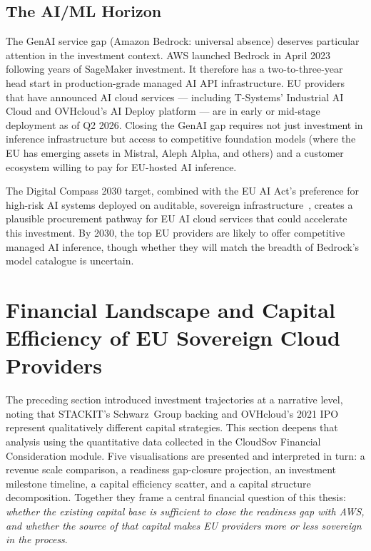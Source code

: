 \subsection{The AI/ML Horizon}

The GenAI service gap (Amazon Bedrock: universal absence) deserves particular attention in the investment context. AWS launched Bedrock in April 2023 following years of SageMaker investment. It therefore has a two-to-three-year head start in production-grade managed AI API infrastructure. EU providers that have announced AI cloud services — including T-Systems' Industrial AI Cloud and OVHcloud's AI Deploy platform — are in early or mid-stage deployment as of Q2 2026. Closing the GenAI gap requires not just investment in inference infrastructure but access to competitive foundation models (where the EU has emerging assets in Mistral, Aleph Alpha, and others) and a customer ecosystem willing to pay for EU-hosted AI inference.

The Digital Compass 2030 target, combined with the EU AI Act's preference for high-risk AI systems deployed on auditable, sovereign infrastructure~\cite{NIS2_2022}, creates a plausible procurement pathway for EU AI cloud services that could accelerate this investment. By 2030, the top EU providers are likely to offer competitive managed AI inference, though whether they will match the breadth of Bedrock's model catalogue is uncertain.

\section{Financial Landscape and Capital Efficiency of EU Sovereign Cloud Providers}
\label{sec:financial_landscape}

The preceding section introduced investment trajectories at a narrative level, noting that STACKIT's Schwarz~Group backing and OVHcloud's 2021 IPO represent qualitatively different capital strategies. This section deepens that analysis using the quantitative data collected in the CloudSov Financial Consideration module. Five visualisations are presented and interpreted in turn: a revenue scale comparison, a readiness gap-closure projection, an investment milestone timeline, a capital efficiency scatter, and a capital structure decomposition. Together they frame a central financial question of this thesis: \emph{whether the existing capital base is sufficient to close the readiness gap with AWS, and whether the source of that capital makes EU providers more or less sovereign in the process}.

